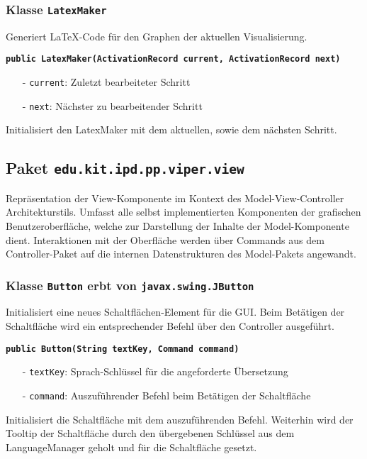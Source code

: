 \documentclass[parskip=full,11pt,twoside]{scrartcl}
\begin{document}
\subsubsection{Klasse \texttt{LatexMaker}}

Generiert LaTeX-Code für den Graphen der aktuellen Visualisierung.

\textbf{\texttt{public LatexMaker(ActivationRecord current, ActivationRecord next)}}
\begin{itemize}[noitemsep]
	\item[-] \texttt{current}: Zuletzt bearbeiteter Schritt
    \item[-] \texttt{next}: Nächster zu bearbeitender Schritt
\end{itemize}
Initialisiert den LatexMaker mit dem aktuellen, sowie dem nächsten Schritt.

\subsection{Paket \texttt{edu.kit.ipd.pp.viper.view}}

Repräsentation der View-Komponente im Kontext des Model-View-Controller Architekturstils. Umfasst alle selbst implementierten Komponenten der grafischen Benutzeroberfläche, welche zur Darstellung der Inhalte der Model-Komponente dient. Interaktionen mit der Oberfläche werden über Commands aus dem Controller-Paket auf die internen Datenstrukturen des Model-Pakets angewandt.

\subsubsection{Klasse \texttt{Button} erbt von \texttt{javax.swing.JButton}}

Initialisiert eine neues Schaltflächen-Element für die GUI. Beim Betätigen der Schaltfläche wird ein entsprechender Befehl über den Controller ausgeführt.

\textbf{\texttt{public Button(String textKey, Command command)}}
\begin{itemize}[noitemsep]
	\item[-] \texttt{textKey}: Sprach-Schlüssel für die angeforderte Übersetzung
	\item[-] \texttt{command}: Auszuführender Befehl beim Betätigen der Schaltfläche
\end{itemize}
Initialisiert die Schaltfläche mit dem auszuführenden Befehl. Weiterhin wird der Tooltip der Schaltfläche durch den übergebenen Schlüssel aus dem LanguageManager geholt und für die Schaltfläche gesetzt.
\end{document}
